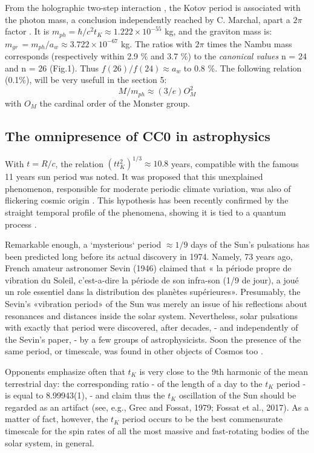\documentclass[twoside,draft]{article}
\begin{document}
\begin{sloppypar}
From the holographic two-step interaction \cite{Sanchez1}, the Kotov period is associated with the photon mass, a conclusion independently reached by C. Marchal, apart a $2\pi$ factor \cite{Marchal}. It is $m_{ph} = \hbar/c^{2} t_{K} \approx 1.222 \times 10^{-55}$ kg, and the graviton mass is: 
$m_{gr}\, = m_{ph} /a_{w} \approx 3.722 \times 10^{-67} $ kg.
The ratios with $2\pi$ times the Nambu mass corresponds (respectively within 2.9 \% and 3.7 \%)  to the \textit{canonical values} n = 24 and n = 26 (Fig.1). Thus $f(26)/f(24) \approx a_w $ to 0.8 \%. The following relation (0.1\%), will be very usefull in the section 5:
\begin{equation}
M/m_{ph} \approx (3/e)O^2_M
\end{equation}
with $O_M$ the cardinal order of the Monster group.

\subsection{The omnipresence of CC0 in astrophysics}

With $t = R/c$, the relation $(t t_{K}^2)^{1/3} \approx 10.8$ years, compatible with the famous 11 years sun period was noted. It was proposed that this unexplained phenomenon, responsible for moderate periodic climate variation, was also of flickering cosmic origin \cite{Sanchez3}. This hypothesis has been recently confirmed by the straight temporal profile of the phenomena, showing it is tied to a quantum process \cite{Kotov2}.

Remarkable enough, a `mysterious` period $\approx 1/9$ days of the Sun's pulsations has been predicted long before its actual discovery in 1974. Namely, 73 years ago, French amateur astronomer Sevin (1946) claimed that « la p\'{e}riode propre de vibration du Soleil, c'est-a-dire la p\'{e}riode de son infra-son (1/9 de jour), a jou\'{e} un role essentiel dans la distribution des plan\`{e}tes sup\'{e}rieures». Presumably, the Sevin's «vibration period» of the Sun was merely an issue of his reflections about resonances and distances inside the solar system. Nevertheless, solar pulsations with exactly that period were discovered, after decades, - and independently of the Sevin's paper, - by a few groups of astrophysicists. Soon the presence of the same period, or timescale, was found in other objects of Cosmos too \cite{Kotov1}.

Opponents emphasize often that $t_{K}$ is very close to the 9th harmonic of the mean terrestrial day: the corresponding ratio - of the length of a day to the $t_{K}$ period - is equal to 8.99943(1), - and claim thus the $t_{K}$ oscillation of the Sun should be regarded as an artifact (see, e.g., Grec and Fossat, 1979; Fossat et al., 2017). As a matter of fact, however, the $t_{K}$ period occurs to be the best commensurate timescale for the spin rates of all the most massive and fast-rotating bodies of the solar system, in general.


\end{sloppypar}
\end{document}
